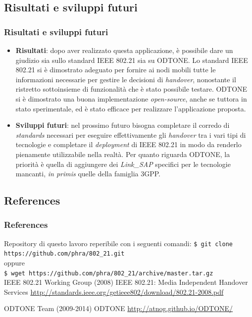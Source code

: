 \documentclass[10pt]{beamer}
\newcommand{\cmduser}[1]{\texttt{\$ #1}\\}
\begin{document}
\subsection{Risultati e sviluppi futuri}
\begin{frame}
\frametitle{Risultati e sviluppi futuri}
\begin{itemize}
\item \textbf{Risultati}: dopo aver realizzato questa applicazione, è possibile dare un giudizio sia sullo standard IEEE 802.21 sia su ODTONE. Lo standard IEEE 802.21 si è dimostrato adeguato per fornire ai nodi mobili tutte le informazioni necessarie per gestire le decisioni di {\em handover}, nonostante il ristretto sottoinsieme di funzionalità che è stato possibile testare. ODTONE si è dimostrato una buona implementazione {\em open-source}, anche se tuttora in stato sperimentale, ed è stato efficace per realizzare l'applicazione proposta. 
\item \textbf{Sviluppi futuri}: nel prossimo futuro bisogna completare il corredo di {\em standards} necessari per eseguire effettivamente gli {\em handover} tra i vari tipi di tecnologie e completare il {\em deployment} di IEEE 802.21 in modo da renderlo pienamente utilizzabile nella realtà.
Per quanto riguarda ODTONE, la priorità è quella di aggiungere dei {\em Link\_SAP} specifici per le tecnologie mancanti, {\em in primis} quelle della famiglia 3GPP.
\end{itemize}
\end{frame}

\subsection{References}
\begin{frame}
\frametitle{References}
\footnotesize{
\begin{thebibliography}{99} %

 Repository di questo lavoro reperibile con i seguenti comandi:
\newblock \cmduser{git clone https://github.com/phra/802\_21.git}
oppure\\
\cmduser{wget https://github.com/phra/802\_21/archive/master.tar.gz}
\vspace{2em}
 IEEE 802.21 Working Group (2008)
\newblock IEEE 802.21: Media Independent Handover Services
\newblock \url{http://standards.ieee.org/getieee802/download/802.21-2008.pdf}

 ODTONE Team (2009-2014)
\newblock ODTONE
\newblock \url{http://atnog.github.io/ODTONE/}


\end{thebibliography}
}
\end{frame}
\end{document}
